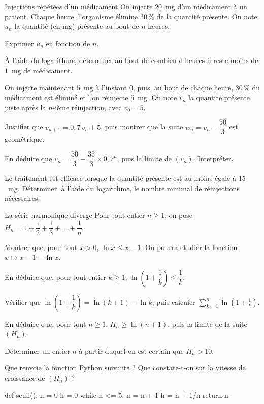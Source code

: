 \begin{exercice}[3]{Injections répétées d'un médicament}
On injecte $20$~mg d'un médicament à un patient. Chaque heure, l'organisme élimine 30\,\% de la quantité présente.
On note $u_n$ la quantité (en mg) présente au bout de $n$ heures.
\begin{questions}
  \item Exprimer $u_n$ en fonction de $n$.
  \item À l'aide du logarithme, déterminer au bout de combien d'heures il reste moins de $1$~mg de médicament.
\end{questions}
On injecte maintenant $5$~mg à l'instant $0$, puis, au bout de chaque heure, 30\,\% du médicament est éliminé et l'on
réinjecte $5$~mg. On note $v_n$ la quantité présente juste après la $n$-ième réinjection, avec $v_0=5$.
\begin{questions}[resume]
  \item Justifier que $v_{n+1}=0{,}7\,v_n+5$, puis montrer que la suite $w_n=v_n-\dfrac{50}{3}$ est géométrique.
  \item En déduire que $v_n=\dfrac{50}{3}-\dfrac{35}{3}\times0{,}7^{n}$, puis la limite de $(v_n)$. Interpréter.
  \item Le traitement est efficace lorsque la quantité présente est au moins égale à $15$~mg. Déterminer, à l'aide du
    logarithme, le nombre minimal de réinjections nécessaires.
\end{questions}
\end{exercice}

\begin{exercice}[3]{La série harmonique diverge}
Pour tout entier $n\geq1$, on pose $H_n=1+\dfrac12+\dfrac13+\dots+\dfrac1n$.
\begin{questions}
  \item Montrer que, pour tout $x>0$, $\ln x\leq x-1$. On pourra étudier la fonction $x\mapsto x-1-\ln x$.
  \item En déduire que, pour tout entier $k\geq1$, $\ln\left(1+\dfrac1k\right)\leq\dfrac1k$.
\end{questions}
\begin{questions}[resume]
  \item Vérifier que $\ln\left(1+\dfrac1k\right)=\ln(k+1)-\ln k$, puis calculer $\displaystyle\sum_{k=1}^{n}\ln\left(1+\frac1k\right)$.
  \item En déduire que, pour tout $n\geq1$, $H_n\geq\ln(n+1)$, puis la limite de la suite $(H_n)$.
  \item Déterminer un entier $n$ à partir duquel on est certain que $H_n>10$.
  \item Que renvoie la fonction Python suivante ? Que constate-t-on sur la vitesse de croissance de $(H_n)$ ?
\begin{python}
def seuil():
    n = 0
    h = 0
    while h <= 5:
        n = n + 1
        h = h + 1/n
    return n
\end{python}
\end{questions}
\end{exercice}

